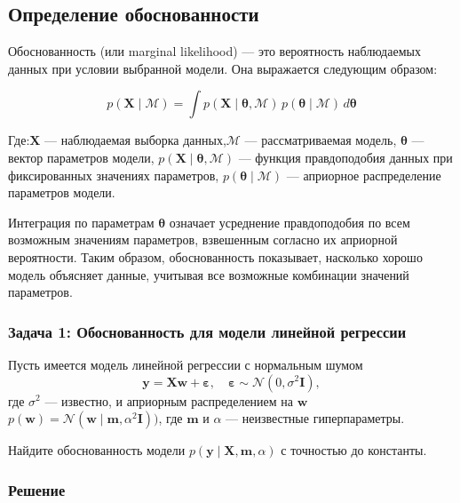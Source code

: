 \subsection{Определение обоснованности}

Обоснованность (или marginal likelihood) — это вероятность наблюдаемых данных при условии выбранной модели. Она выражается следующим образом:

\begin{equation}
    p(\mathbf{X} \mid \mathcal{M}) = \int p(\mathbf{X} \mid \boldsymbol{\theta}, \mathcal{M}) \, p(\boldsymbol{\theta} \mid \mathcal{M}) \, d\boldsymbol{\theta}
\end{equation}

Где:$\mathbf{X}$ — наблюдаемая выборка данных,$\mathcal{M}$ — рассматриваемая модель, $\boldsymbol{\theta}$ — вектор параметров модели, $p(\mathbf{X} \mid \boldsymbol{\theta}, \mathcal{M})$ — функция правдоподобия данных при фиксированных значениях параметров, $p(\boldsymbol{\theta} \mid \mathcal{M})$ — априорное распределение параметров модели.

Интеграция по параметрам $\boldsymbol{\theta}$ означает усреднение правдоподобия по всем возможным значениям параметров, взвешенным согласно их априорной вероятности. Таким образом, обоснованность показывает, насколько хорошо модель объясняет данные, учитывая все возможные комбинации значений параметров.

\subsubsection{Задача 1: Обоснованность для модели линейной регрессии}
Пусть имеется модель линейной регрессии с нормальным шумом
\begin{equation*}
 \mathbf{y} = \mathbf{X}\mathbf{w} + \boldsymbol{\varepsilon}, \quad \boldsymbol{\varepsilon} \sim \mathcal{N}(0, \sigma^2 \mathbf{I}),
\end{equation*}
где $\sigma^2$ --- известно, и априорным распределением на $\mathbf{w}$ $p(\mathbf{w}) = \mathcal{N}(\mathbf{w} \mid \mathbf{m}, \alpha^2 \mathbf{I}))$, где $\mathbf{m}$ и $\alpha$ ---
неизвестные гиперпараметры.

Найдите обоснованность модели $p(\mathbf{y} \mid \mathbf{X}, \mathbf{m}, \alpha)$ с точностью до константы.

\subsubsection*{Решение}

